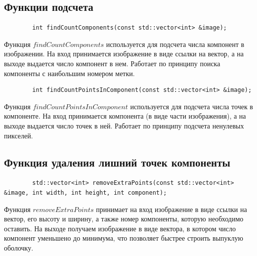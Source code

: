 \documentclass[a4paper, 12pt]{extarticle}
\begin{document}
	\subsection{Функции подсчета}
	\begin{verbatim}
		int findCountComponents(const std::vector<int> &image);
	\end{verbatim}
	Функция $findCountComponents$ используется для подсчета числа компонент в изображении. На вход принимается изображение в виде ссылки на вектор, а на выходе выдается число компонент в нем. Работает по принципу поиска компоненты с наибольшим номером метки.
	\begin{verbatim}
		int findCountPointsInComponent(const std::vector<int> &image);
	\end{verbatim}
	Функция $findCountPointsInComponent$ используется для подсчета числа точек в компоненте. На вход принимается компонента (в виде части изображения), а на выходе выдается число точек в ней. Работает по принципу подсчета ненулевых пикселей.
	
	\subsection{Функция удаления лишний точек компоненты}
	\begin{verbatim}
		std::vector<int> removeExtraPoints(const std::vector<int> &image, int width, int height, int component);
	\end{verbatim}
	Функция $removeExtraPoints$ принимает на вход изображение в виде ссылки на вектор, его высоту и ширину, а также номер компоненты, которую необходимо оставить. На выходе получаем изображение в виде вектора, в котором число компонент уменьшено до минимума, что позволяет быстрее строить выпуклую оболочку.
	
\end{document}
